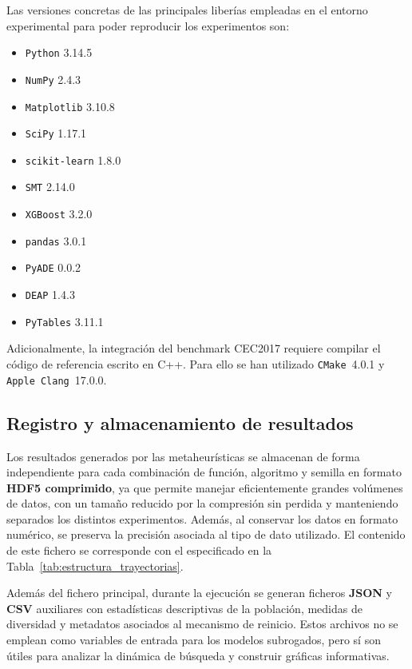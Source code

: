 Las versiones concretas de las principales liberías empleadas en el entorno experimental para poder reproducir los experimentos son:

\begin{itemize}
    \item \texttt{Python} 3.14.5
    \item \texttt{NumPy} 2.4.3
    \item \texttt{Matplotlib} 3.10.8
    \item \texttt{SciPy} 1.17.1
    \item \texttt{scikit-learn} 1.8.0
    \item \texttt{SMT} 2.14.0
    \item \texttt{XGBoost} 3.2.0
    \item \texttt{pandas} 3.0.1
    \item \texttt{PyADE} 0.0.2
    \item \texttt{DEAP} 1.4.3
    \item \texttt{PyTables} 3.11.1
\end{itemize}

Adicionalmente, la integración del benchmark CEC2017 requiere compilar el código de referencia escrito en C++. Para ello se han utilizado \texttt{CMake}~4.0.1 y \texttt{Apple Clang}~17.0.0.

\subsection{Registro y almacenamiento de resultados}

Los resultados generados por las metaheurísticas se almacenan de forma independiente para cada combinación de función, algoritmo y semilla en formato \textbf{HDF5 comprimido}, ya que permite manejar eficientemente grandes volúmenes de datos, con un tamaño reducido por la compresión sin perdida y manteniendo separados los distintos experimentos. Además, al conservar los datos en formato numérico, se preserva la precisión asociada al tipo de dato utilizado. El contenido de este fichero se corresponde con el especificado en la Tabla~\ref{tab:estructura_trayectorias}.

Además del fichero principal, durante la ejecución se generan ficheros
\textbf{JSON} y \textbf{CSV} auxiliares con estadísticas descriptivas de la
población, medidas de diversidad y metadatos asociados al mecanismo de
reinicio. Estos archivos no se emplean como variables de entrada para los modelos subrogados, pero sí son útiles para analizar la dinámica de búsqueda y construir gráficas informativas.

